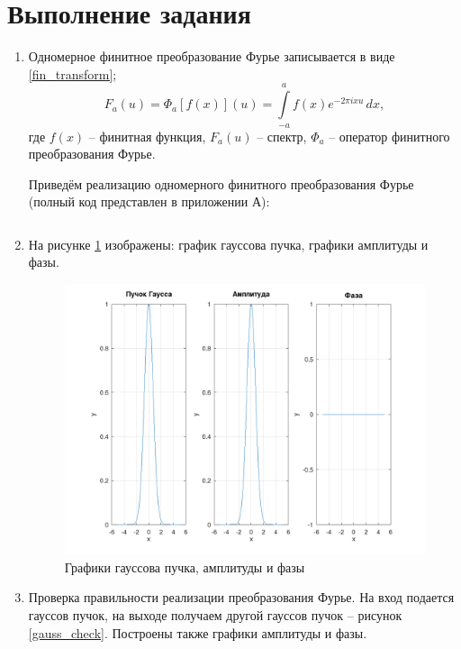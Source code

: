 \section*{Выполнение задания}
{
	\begin{enumerate}
		\item {
			Одномерное финитное преобразование Фурье записывается в виде \eqref{fin_transform};
			\begin{equation}\label{fin_transform}
			F_a(u) = \Phi_a \left[ f(x) \right] (u) = \int\limits_{-a}^{a} f(x) e^{-2 \pi i x u} \,dx,
			\end{equation}
			где $f(x)$ -- финитная функция, $F_a(u)$ -- спектр, $\Phi_a$ -- оператор финитного преобразования Фурье.
			
			Приведём реализацию одномерного финитного преобразования Фурье (полный код представлен в приложении А):
			
		\inputminted[breaklines, mathescape, fontsize=\footnotesize]{octave}{./src/solve_with_fft.m}
		}
		
		\item {
			На рисунке \ref{gauss} изображены: график гауссова пучка, графики амплитуды и фазы.
			
			\begin{figure}[H]
				\includegraphics[width=0.75\pagewidth]{gauss}
				\caption{Графики гауссова пучка, амплитуды и фазы}
				\label{gauss}
			\end{figure}
		}
		
		\item{
			Проверка правильности реализации преобразования Фурье. На вход подается гауссов пучок, на выходе получаем другой гауссов пучок -- рисунок \ref{gauss_check}. Построены также графики амплитуды и фазы.
			
}
\end{enumerate}}
